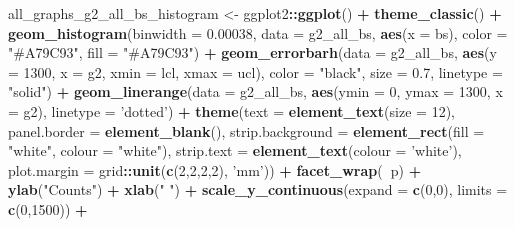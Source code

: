 \documentclass[]{article}
\newenvironment{Shaded}{\begin{snugshade}}{\end{snugshade}}
\newcommand{\KeywordTok}[1]{\textcolor[rgb]{0.13,0.29,0.53}{\textbf{#1}}}
\newcommand{\DataTypeTok}[1]{\textcolor[rgb]{0.13,0.29,0.53}{#1}}
\newcommand{\DecValTok}[1]{\textcolor[rgb]{0.00,0.00,0.81}{#1}}
\newcommand{\FloatTok}[1]{\textcolor[rgb]{0.00,0.00,0.81}{#1}}
\newcommand{\StringTok}[1]{\textcolor[rgb]{0.31,0.60,0.02}{#1}}
\newcommand{\OperatorTok}[1]{\textcolor[rgb]{0.81,0.36,0.00}{\textbf{#1}}}
\newcommand{\NormalTok}[1]{#1}
\begin{document}
\begin{Shaded}
\begin{Highlighting}[]
\NormalTok{all_graphs_g2_all_bs_histogram <-}
\StringTok{  }\NormalTok{ggplot2}\OperatorTok{::}\KeywordTok{ggplot}\NormalTok{() }\OperatorTok{+}
\StringTok{  }\KeywordTok{theme_classic}\NormalTok{() }\OperatorTok{+}
\StringTok{  }\KeywordTok{geom_histogram}\NormalTok{(}\DataTypeTok{binwidth =} \FloatTok{0.00038}\NormalTok{, }\DataTypeTok{data =}\NormalTok{ g2_all_bs, }\KeywordTok{aes}\NormalTok{(}\DataTypeTok{x =}\NormalTok{ bs),}
                 \DataTypeTok{color =} \StringTok{"#A79C93"}\NormalTok{,}
                 \DataTypeTok{fill =} \StringTok{"#A79C93"}\NormalTok{) }\OperatorTok{+}
\StringTok{  }\KeywordTok{geom_errorbarh}\NormalTok{(}\DataTypeTok{data =}\NormalTok{ g2_all_bs,}
                 \KeywordTok{aes}\NormalTok{(}\DataTypeTok{y =} \DecValTok{1300}\NormalTok{, }\DataTypeTok{x =}\NormalTok{ g2, }\DataTypeTok{xmin =}\NormalTok{ lcl, }\DataTypeTok{xmax =}\NormalTok{ ucl),}
                 \DataTypeTok{color =} \StringTok{"black"}\NormalTok{, }\DataTypeTok{size =} \FloatTok{0.7}\NormalTok{, }\DataTypeTok{linetype =} \StringTok{"solid"}\NormalTok{) }\OperatorTok{+}
\StringTok{  }\KeywordTok{geom_linerange}\NormalTok{(}\DataTypeTok{data =}\NormalTok{ g2_all_bs,  }\KeywordTok{aes}\NormalTok{(}\DataTypeTok{ymin =} \DecValTok{0}\NormalTok{, }\DataTypeTok{ymax =} \DecValTok{1300}\NormalTok{, }\DataTypeTok{x =}\NormalTok{ g2),}
                 \DataTypeTok{linetype =} \StringTok{'dotted'}\NormalTok{) }\OperatorTok{+}
\StringTok{  }\KeywordTok{theme}\NormalTok{(}\DataTypeTok{text =} \KeywordTok{element_text}\NormalTok{(}\DataTypeTok{size =} \DecValTok{12}\NormalTok{),}
        \DataTypeTok{panel.border =} \KeywordTok{element_blank}\NormalTok{(),}
        \DataTypeTok{strip.background =} \KeywordTok{element_rect}\NormalTok{(}\DataTypeTok{fill =} \StringTok{"white"}\NormalTok{, }\DataTypeTok{colour =} \StringTok{"white"}\NormalTok{),}
        \DataTypeTok{strip.text =} \KeywordTok{element_text}\NormalTok{(}\DataTypeTok{colour =} \StringTok{'white'}\NormalTok{),}
        \DataTypeTok{plot.margin =}\NormalTok{ grid}\OperatorTok{::}\KeywordTok{unit}\NormalTok{(}\KeywordTok{c}\NormalTok{(}\DecValTok{2}\NormalTok{,}\DecValTok{2}\NormalTok{,}\DecValTok{2}\NormalTok{,}\DecValTok{2}\NormalTok{), }\StringTok{'mm'}\NormalTok{)) }\OperatorTok{+}
\StringTok{  }\KeywordTok{facet_wrap}\NormalTok{(}\OperatorTok{~}\NormalTok{p) }\OperatorTok{+}
\StringTok{  }\KeywordTok{ylab}\NormalTok{(}\StringTok{"Counts"}\NormalTok{) }\OperatorTok{+}
\StringTok{  }\KeywordTok{xlab}\NormalTok{(}\StringTok{" "}\NormalTok{) }\OperatorTok{+}
\StringTok{  }\KeywordTok{scale_y_continuous}\NormalTok{(}\DataTypeTok{expand =} \KeywordTok{c}\NormalTok{(}\DecValTok{0}\NormalTok{,}\DecValTok{0}\NormalTok{), }\DataTypeTok{limits =} \KeywordTok{c}\NormalTok{(}\DecValTok{0}\NormalTok{,}\DecValTok{1500}\NormalTok{)) }\OperatorTok{+}

\end{Highlighting}
\end{Shaded}
\end{document}

